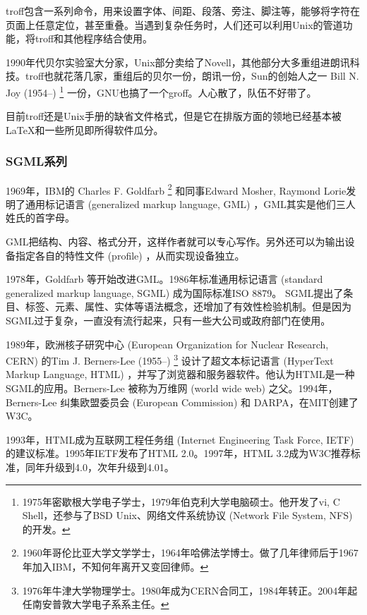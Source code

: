 troff包含一系列命令，用来设置字体、间距、段落、旁注、脚注等，能够将字符在页面上任意定位，甚至重叠。当遇到复杂任务时，人们还可以利用Unix的管道功能，将troff和其他程序结合使用。

1990年代贝尔实验室大分家，Unix部分卖给了Novell，其他部分大多重组进朗讯科技\indexLucent{}。troff也就花落几家，重组后的贝尔一份，朗讯一份，Sun的创始人之一 Bill N. Joy (1954--)\indexJoy{} \footnote{1975年密歇根大学电子学士，1979年伯克利大学电脑硕士。他开发了vi, C Shell，还参与了BSD Unix、网络文件系统协议 (Network File System, NFS) 的开发。} 一份，GNU\indexGNU 也搞了一个groff。人心散了，队伍不好带了。

目前troff还是Unix手册的缺省文件格式，但是它在排版方面的领地已经基本被 \LaTeX 和一些所见即所得软件瓜分。

\subsubsection{SGML系列}

1969年，IBM\indexIBM 的 Charles F. Goldfarb\indexGoldfarb{} \footnote{1960年哥伦比亚大学文学学士，1964年哈佛法学博士。做了几年律师后于1967年加入IBM，不知何年离开又变回律师。} 和同事Edward Mosher\indexMosher , Raymond Lorie\indexLorie 发明了通用标记语言 (generalized markup language, GML) ，GML其实是他们三人姓氏的首字母。

GML把结构、内容、格式分开，这样作者就可以专心写作。另外还可以为输出设备指定各自的特性文件 (profile) ，从而实现设备独立。

1978年，Goldfarb 等开始改进GML。1986年标准通用标记语言 (standard generalized markup language, SGML) 成为国际标准ISO 8879。 SGML提出了条目、标签、元素、属性、实体等语法概念，还增加了有效性检验机制。但是因为SGML过于复杂，一直没有流行起来，只有一些大公司或政府部门在使用。

1989年，欧洲核子研究中心 (European Organization for Nuclear Research, CERN)\indexCERN{} 的Tim J. Berners-Lee (1955--)\indexBernersLee{} \footnote{1976年牛津大学物理学士。1980年成为CERN合同工，1984年转正。2004年起任南安普敦大学电子系系主任。} 设计了超文本标记语言 (HyperText Markup Language, HTML) ，并写了浏览器和服务器软件。他认为HTML是一种SGML的应用。Berners-Lee 被称为万维网 (world wide web) 之父。1994年，Berners-Lee 纠集欧盟委员会 (European Commission) \indexEC 和 DARPA\indexDARPA{}，在MIT\indexMIT 创建了W3C\indexWWWC。

1993年，HTML成为互联网工程任务组 (Internet Engineering Task Force, IETF)\indexIETF{} 的建议标准。1995年IETF发布了HTML 2.0。1997年，HTML 3.2成为W3C推荐标准，同年升级到4.0，次年升级到4.01。

